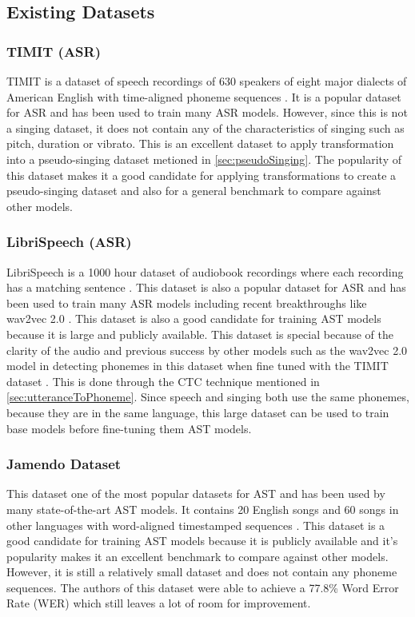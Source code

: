 \documentclass[letterpaper, 12pt]{article}
\begin{document}
\begin{multicols*}{2}
\subsection{Existing Datasets} \label{sec:datasets}

\subsubsection{TIMIT (ASR)}
TIMIT is a dataset of speech recordings of 630 speakers of eight major dialects of American English
with time-aligned phoneme sequences \citep{TIMIT}. It is a popular dataset for ASR and has been used
to train many ASR models. However, since this is not a singing dataset, it does not contain any of
the characteristics of singing such as pitch, duration or vibrato. This is an excellent dataset to
apply transformation into a pseudo-singing dataset metioned in \ref{sec:pseudoSinging}. The popularity of this dataset
makes it a good candidate for applying transformations to create a pseudo-singing dataset and also
for a general benchmark to compare against other models.

\subsubsection{LibriSpeech (ASR)}
LibriSpeech is a 1000 hour dataset of audiobook recordings where each recording has a matching sentence \citep{Librispeech}. This
dataset is also a popular dataset for ASR and has been used to train many ASR models including
recent breakthroughs like wav2vec 2.0 \citep{wav2vec}. This dataset is also a good candidate for
training AST models because it is large and publicly available. This dataset is special because of
the clarity of the audio and previous success by other models such as the wav2vec 2.0 model in
detecting phonemes in this dataset when fine tuned with the TIMIT dataset \citep{wav2vec}. This is
done through the CTC technique mentioned in \ref{sec:utteranceToPhoneme}. Since
speech and singing both use the same phonemes, because they are in the same language, this large
dataset can be used to train base models before fine-tuning them AST models.

\subsubsection{Jamendo Dataset}
This dataset one of the most popular datasets for AST and has been used by many state-of-the-art
AST models. It contains 20 English songs and 60 songs in other languages with word-aligned timestamped sequences \citep{JamendoLyrics}. This dataset
is a good candidate for training AST models because it is publicly available and it's popularity
makes it an excellent benchmark to compare against other models. However, it is still a relatively
small dataset and does not contain any phoneme sequences. The authors of this dataset were able to
achieve a 77.8\% Word Error Rate (WER) which still leaves a lot of room for improvement.


\end{multicols*}
\end{document}
